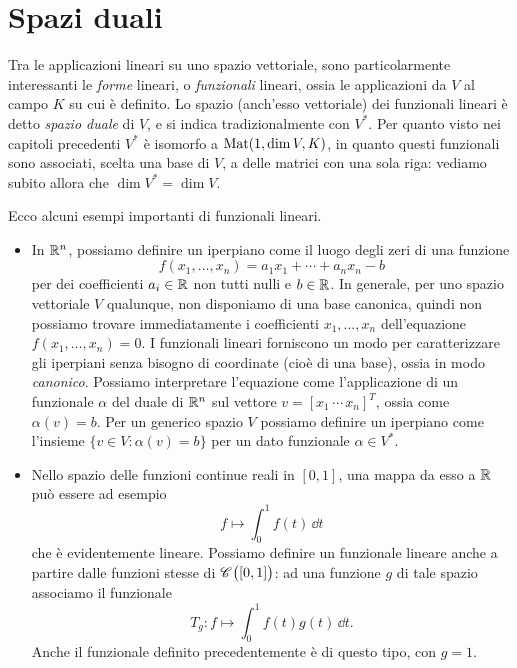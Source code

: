 \chapter{Spazi duali}
Tra le applicazioni lineari su uno spazio vettoriale, sono particolarmente interessanti le \emph{forme} lineari, o \emph{funzionali} lineari, ossia le applicazioni da $V$ al campo $K$ su cui è definito.
Lo spazio (anch'esso vettoriale) dei funzionali lineari è detto \emph{spazio duale} di $V$, e si indica tradizionalmente con $V^*$.
Per quanto visto nei capitoli precedenti $V^*$ è isomorfo a $\operatorname{Mat}(1,\dim V,K)$, in quanto questi funzionali sono associati, scelta una base di $V$, a delle matrici con una sola riga: vediamo subito allora che $\dim V^*=\dim V$.

Ecco alcuni esempi importanti di funzionali lineari.
\begin{itemize}
	\item In $\mathbb{R}^n$, possiamo definire un iperpiano come il luogo degli zeri di una funzione
		\begin{equation*}
			f(x_1,\dots,x_n)=a_1x_1+\cdots+a_nx_n-b
		\end{equation*}
		per dei coefficienti $a_i\in\mathbb{R}$ non tutti nulli e $b\in\mathbb{R}$.
		In generale, per uno spazio vettoriale $V$ qualunque, non disponiamo di una base canonica, quindi non possiamo trovare immediatamente i coefficienti $x_1,\dots,x_n$ dell'equazione $f(x_1,\dots,x_n)=0$.
		I funzionali lineari forniscono un modo per caratterizzare gli iperpiani senza bisogno di coordinate (cioè di una base), ossia in modo \emph{canonico}.
		Possiamo interpretare l'equazione come l'applicazione di un funzionale $\alpha$ del duale di $\mathbb{R}^n$ sul vettore $v=[x_1\,\cdots\, x_n]^T$, ossia come $\alpha(v)=b$.
		Per un generico spazio $V$ possiamo definire un iperpiano come l'insieme $\{v\in V\colon \alpha(v)=b\}$ per un dato funzionale $\alpha\in V^*$.
	\item Nello spazio delle funzioni continue reali in $[0,1]$, una mappa da esso a $\mathbb{R}$ può essere ad esempio 
		\begin{equation*}
			f\mapsto\int_0^1f(t)\,\dd t
		\end{equation*}
		che è evidentemente lineare.
		Possiamo definire un funzionale lineare anche a partire dalle funzioni stesse di $\mathscr{C}^{{}}\big([0,1]\big)$: ad una funzione $g$ di tale spazio associamo il funzionale
		\begin{equation*}
			T_g\colon f\mapsto\int_0^1f(t)g(t)\,\dd t.
		\end{equation*}
		Anche il funzionale definito precedentemente è di questo tipo, con $g=1$.
\end{itemize}

